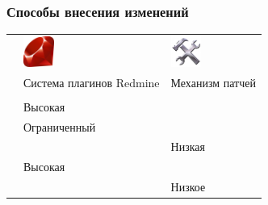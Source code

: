 \documentclass[unicode]{beamer}
\begin{document}
\begin{frame}
\transwipe[direction=90]
\frametitle{Способы внесения изменений}
\begin{tabular}{ >{\centering\arraybackslash}m{}  >{\centering\arraybackslash}m{}
>{\centering\arraybackslash}m{}}

&\includegraphics[width=1cm]{Ruby_logo.pdf}&\includegraphics[width=1cm]{patch-management.jpg}\\
& Система плагинов Redmine & Механизм патчей\\
&&\\
\hline
\color{blue}{Сложность разработки} & Высокая & \color{red}{Низкая} \\
\hline
\color{blue}{Спектр решаемых задач} & Ограниченный & \color{red}{Максимальный}\\
\hline
\color{blue}{Устойчивость к обновлениям системы} & \color{red}{Высокая} & Низкая \\
\hline
\color{blue}{Стоимость внесения изменений} & Высокая & \color{red}{Средняя} \\
\hline
\color{blue}{Удобство распространения} & \color{red}{Высокое} & Низкое \\
\hline
\end{tabular}
\end{frame}
\end{document}
